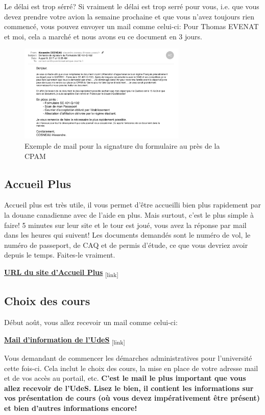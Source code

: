  \begin{example}{Le délai est trop sérré?}
   Si vraiment le délai est trop serré pour vous, i.e. que vous devez prendre votre avion la semaine prochaine et que vous n'avez toujours rien commencé, vous pouvez envoyer un mail comme celui-ci:
   Pour Thomas EVENAT et moi, cela a marché et nous avons eu ce document en 3 jours.
 \end{example}

 \begin{figure}[h!]
 \centering
 \includegraphics[width = 80mm]{figures/Mail_CPAM}
 \caption{Exemple de mail pour la signature du formulaire au près de la CPAM}
 \end{figure}

 \subsection{Accueil Plus}\label{sec:sec3.2.8}
 Accueil plus est très utile, il vous permet d'être accueilli bien plus rapidement par la douane canadienne avec de l'aide en plus. Mais surtout, c'est le plus simple à faire! 5 minutes sur leur site et le tour est joué, vous avez la réponse par mail dans les heures qui suivent!
 Les documents demandés sont le numéro de vol, le numéro de passeport, de CAQ et de permis d’étude, ce que vous devriez avoir depuis le temps.
 Faites-le vraiment.

\bigbreak
\href{http://www.accueilplus.ca/}{\textbf{URL du site d'Accueil Plus}}\textsubscript{  [link]}


\subsection{Choix des cours}\label{sec:sec3.2.9}

Début août, vous allez recevoir un mail comme celui-ci:

\bigbreak
\href{Annexes/Sherbrooke/Mail_Info_UdeS.pdf}{\textbf{Mail d'information de l'UdeS}}\textsubscript{  [link]}
\bigbreak

Vous demandant de commencer les démarches administratives pour l'université cette fois-ci. Cela inclut le choix des cours, la mise en place de votre adresse mail et de vos accès au portail, etc.
\bigbreak
\textbf{C'est le mail le plus important que vous allez recevoir de l'UdeS. Lisez le bien, il contient les informations sur vos présentation de cours (où vous devez impérativement être présent) et bien d'autres informations encore!}

